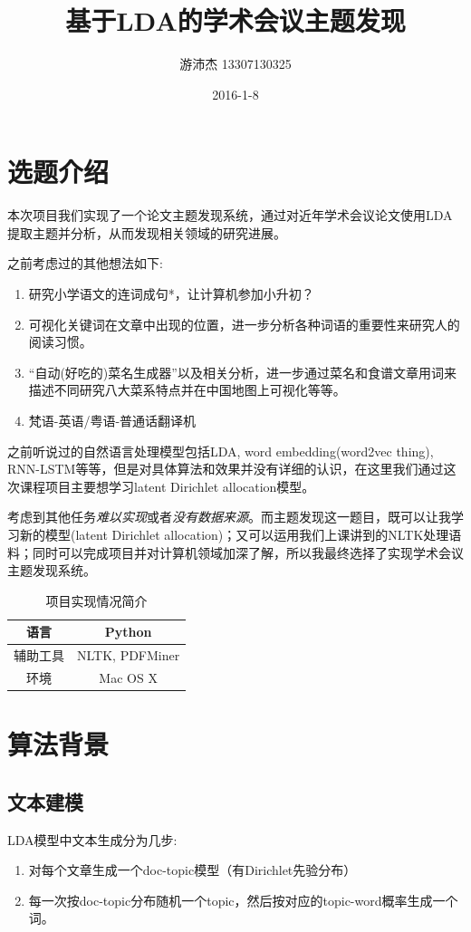 \documentclass{article}
\title{基于LDA的学术会议主题发现}
\author{游沛杰 13307130325}
\date{2016-1-8}
\begin{document}
\maketitle
\tableofcontents
\newpage

\section{选题介绍}

本次项目我们实现了一个论文主题发现系统，通过对近年学术会议论文使用LDA提取主题并分析，从而发现相关领域的研究进展。

之前考虑过的其他想法如下:
\begin{enumerate}
	\item	研究小学语文的连词成句*，让计算机参加小升初？
	\item	可视化关键词在文章中出现的位置，进一步分析各种词语的重要性来研究人的阅读习惯。
	\item	“自动(好吃的)菜名生成器”以及相关分析，进一步通过菜名和食谱文章用词来描述不同研究八大菜系特点并在中国地图上可视化等等。
	\item	梵语-英语/粤语-普通话翻译机
\end{enumerate}

之前听说过的自然语言处理模型包括LDA, word embedding(word2vec thing), RNN-LSTM等等，但是对具体算法和效果并没有详细的认识，在这里我们通过这次课程项目主要想学习latent Dirichlet allocation模型。
	
考虑到其他任务\emph{难以实现}或者\emph{没有数据来源}。而主题发现这一题目，既可以让我学习新的模型(latent Dirichlet allocation)；又可以运用我们上课讲到的NLTK处理语料；同时可以完成项目并对计算机领域加深了解，所以我最终选择了实现学术会议主题发现系统。

\begin{center}
\begin{table}[!ht]
\centering
\caption{项目实现情况简介}
\large
\begin{tabular}{|c|c|}
\hline
语言 & Python\\
\hline
辅助工具 & NLTK, PDFMiner\\
\hline
环境 & Mac OS X\\
\hline
\end{tabular}
\end{table}
\end{center}

\section{算法背景}
\subsection{文本建模}
LDA模型中文本生成分为几步:
\begin{enumerate}
	\item	对每个文章生成一个doc-topic模型（有Dirichlet先验分布）
	\item	每一次按doc-topic分布随机一个topic，然后按对应的topic-word概率生成一个词。
\end{enumerate}
\end{document}
